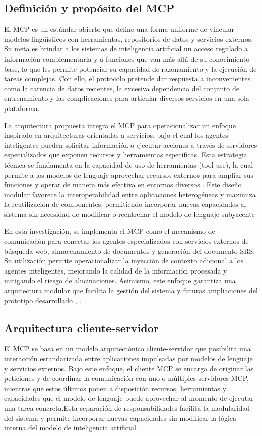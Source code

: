 \subsection{Definición y propósito del MCP}

El MCP es un estándar abierto que define una forma uniforme de vincular modelos lingüísticos con herramientas, 
repositorios de datos y servicios externos. Su meta es brindar a los sistemas de inteligencia artificial un acceso regulado a información 
complementaria y a funciones que van más allá de su conocimiento base, lo que les permite potenciar su capacidad de razonamiento y la ejecución 
de tareas complejas. Con ello, el protocolo pretende dar respuesta a inconvenientes como la carencia de datos recientes, la excesiva dependencia 
del conjunto de entrenamiento y las complicaciones para articular diversos servicios en una sola plataforma.

La arquitectura propuesta integra el MCP para operacionalizar un enfoque inspirado en arquitecturas orientadas a servicios, 
bajo el cual los agentes inteligentes pueden solicitar información o ejecutar acciones a través de servidores especializados que exponen recursos y 
herramientas específicas. Esta estrategia técnica se fundamenta en la capacidad de uso de herramientas (tool-use), la cual permite a los modelos de 
lenguaje aprovechar recursos externos para ampliar sus funciones y operar de manera más efectiva en entornos diversos . Este diseño modular favorece 
la interoperabilidad entre aplicaciones heterogéneas y maximiza la reutilización de componentes, permitiendo incorporar nuevas capacidades al sistema 
sin necesidad de modificar o reentrenar el modelo de lenguaje subyacente \cite{Guo2024}

En esta investigación, se implementa el MCP como el mecanismo de comunicación para conectar los agentes especializados 
con servicios externos de búsqueda web, almacenamiento de documentos y generación del documento SRS. Su utilización permite operacionalizar la 
inyección de contexto adicional a los agentes inteligentes, mejorando la calidad de la información procesada y mitigando el riesgo de alucinaciones.
Asimismo, este enfoque garantiza una arquitectura modular que facilita la gestión del sistema y futuras ampliaciones del prototipo desarrollado
\cite{Guo2024}, \cite{xi2025rise}.

\subsection{Arquitectura cliente-servidor}
El MCP se basa en un modelo arquitectónico cliente-servidor que posibilita una interacción estandarizada entre 
aplicaciones impulsadas por modelos de lenguaje y servicios externos. Bajo este enfoque, el cliente MCP se encarga de originar las peticiones 
y de coordinar la comunicación con uno o múltiples servidores MCP, mientras que estos últimos ponen a disposición recursos, herramientas y 
capacidades que el modelo de lenguaje puede aprovechar al momento de ejecutar una tarea concreta.Esta separación de responsabilidades facilita la 
modularidad del sistema y permite incorporar nuevas capacidades sin modificar la lógica interna del modelo de inteligencia artificial.

